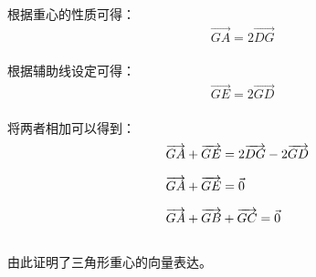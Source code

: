 \documentclass[UTF8]{ctexart}
\let\nvec\vec
\def\vec#1{\nvec{\vphantom b\smash{#1}}}
\begin{document}
    根据重心的性质可得：
    \begin{align}
        &\overrightarrow{GA}=2\overrightarrow{DG}
    \end{align}\\
    根据辅助线设定可得：
    \begin{align}
        &\overrightarrow{GE}=2\overrightarrow{GD}        
    \end{align}\\
    将两者相加可以得到：
    \begin{align}
        &\overrightarrow{GA}+\overrightarrow{GE}=2\overrightarrow{DG}-2\overrightarrow{GD}\\[2.5mm]
        &\overrightarrow{GA}+\overrightarrow{GE}=\vec{0}\\[2.5mm]
        &\overrightarrow{GA}+\overrightarrow{GB}+\overrightarrow{GC}=\vec{0}
    \end{align}\\
    由此证明了三角形重心的向量表达。

\newpage
\end{document}
